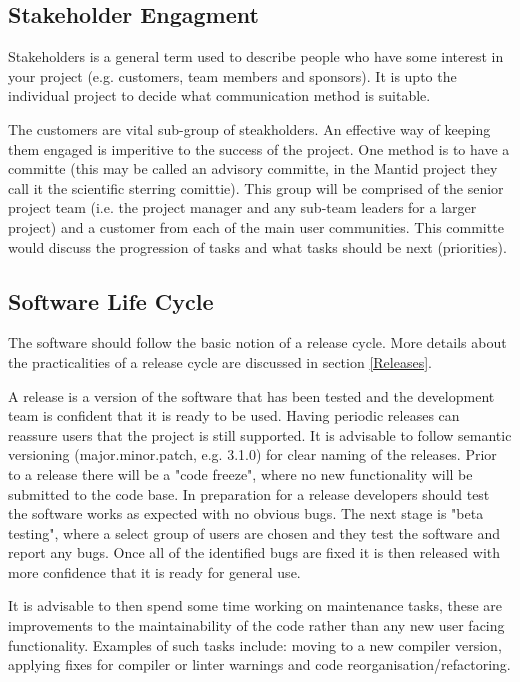 \documentclass[jnr]{iosart2x}
\begin{document}
\subsection{Stakeholder Engagment}\label{se}
Stakeholders is a general term used to describe people who have some interest in your project (e.g. customers, team members and sponsors).
It is upto the individual project to decide what communication method is suitable.

The customers are vital sub-group of steakholders.
An effective way of keeping them engaged is imperitive to the success of the project.
One method is to have a committe (this may be called an advisory committe, in the Mantid project they call it the scientific sterring comittie).
This group will be comprised of the senior project team (i.e. the project manager and any sub-team leaders for a larger project) and a customer from each of the main user communities.
This committe would discuss the progression of tasks and what tasks should be next (priorities).

\subsection{Software Life Cycle}\label{lc}
The software should follow the basic notion of a release cycle. More details about the practicalities of a release cycle are discussed in section \ref{Releases}.

A release is a version of the software that has been tested and the development team is confident that it is ready to be used.
Having periodic releases can reassure users that the project is still supported.
It is advisable to follow semantic versioning \cite{Semantic_Versioning} (major.minor.patch, e.g. 3.1.0) for clear naming of the releases.
Prior to a release there will be a "code freeze", where no new functionality will be submitted to the code base.
In preparation for a release developers should test the software works as expected with no obvious bugs.
The next stage is "beta testing", where a select group of users are chosen and they test the software and report any bugs.
Once all of the identified bugs are fixed it is then released with more confidence that it is ready for general use.

It is advisable to then spend some time working on maintenance tasks, these are improvements to the maintainability of the code rather than any new user facing functionality.
Examples of such tasks include: moving to a new compiler version, applying fixes for compiler or linter warnings and code reorganisation/refactoring.
\end{document}
